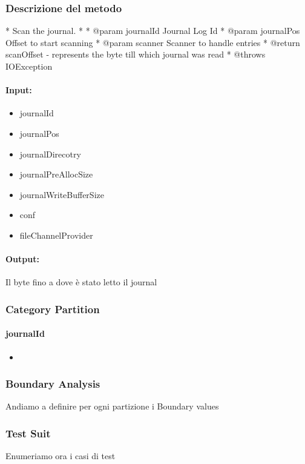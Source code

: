 \documentclass[12pt, a4paper]{article}
\begin{document}
\subsubsection{Descrizione del metodo}
 * Scan the journal.
 *
 * @param journalId Journal Log Id
 * @param journalPos Offset to start scanning
 * @param scanner Scanner to handle entries
 * @return scanOffset - represents the byte till which journal was read
 * @throws IOException
\paragraph{Input:}
\begin{itemize}
  \item journalId
  \item journalPos
  \item journalDirecotry
  \item journalPreAllocSize
  \item journalWriteBufferSize
  \item conf
  \item fileChannelProvider
\end{itemize}
\paragraph{Output:}
Il byte fino a dove è stato letto il journal

\subsubsection{Category Partition}

\paragraph{journalId}
\begin{itemize}
  \item 
\end{itemize}



\subsubsection{Boundary Analysis}
Andiamo a definire per ogni partizione i Boundary values

\subsubsection{Test Suit}
Enumeriamo ora i casi di test
\end{document}
